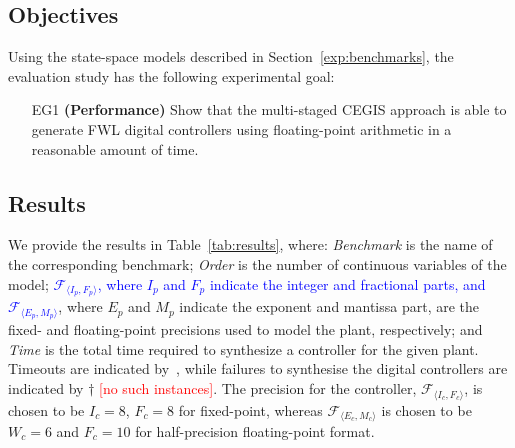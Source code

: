 \documentclass[twocolumn]{autart}    %
\newcommand{\xmark}{\ding{55}}
\renewcommand{\note}[1]{\textcolor{red}{[#1]}}
\begin{document}
 
\subsection{Objectives}
\label{exp:objectives}

Using the state-space models described in Section~\ref{exp:benchmarks}, 
the evaluation study has the following experimental goal: 

\begin{enumerate}

\item[EG1] \textbf{(Performance)} Show that the multi-staged 
CEGIS approach is able to generate FWL digital controllers using floating-point arithmetic in a reasonable amount of time.


\end{enumerate}

\subsection{Results}
\label{exp:results}

We provide the results in Table~\ref{tab:results}, where: 
\textit{Benchmark} is the name of the corresponding benchmark; 
\textit{Order} is the number of continuous variables of the model; 
\textcolor{blue}{$\mathcal{F}_{\langle I_p,F_p \rangle}$, where $I_p$ and $F_p$ indicate the integer and fractional parts,  
and $\mathcal{F}_{\langle E_p,M_p \rangle}$}, where $E_p$ and $M_p$ indicate the exponent and mantissa part, 
are the fixed- and floating-point precisions used to model the plant, respectively; 
and \textit{Time} is the total time required to synthesize a controller for the given plant.    
Timeouts are indicated by~\xmark, while failures to synthesise the digital controllers are indicated by $\dagger$ \note{no such instances}.  
The precision for the controller, $\mathcal{F}_{\langle I_c,F_c \rangle}$, is
chosen to be $I_c = 8$, $F_c = 8$ for fixed-point, whereas  
$\mathcal{F}_{\langle E_c, M_c \rangle}$ is chosen to be $W_c = 6$ and $F_c = 10$
for half-precision floating-point format.
\end{document}
